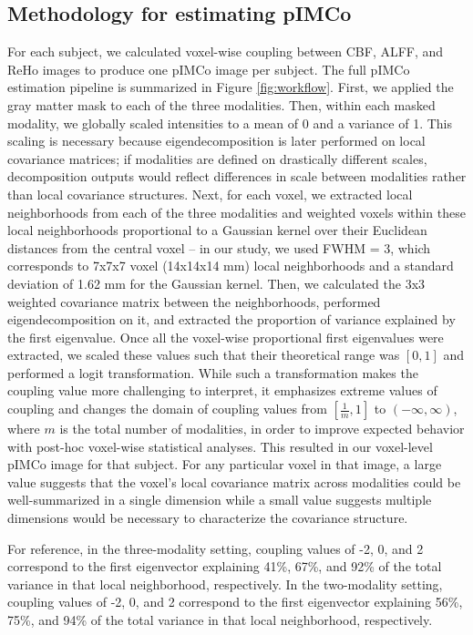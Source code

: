 \documentclass[
  12pt,
]{article}
\begin{document}
\hypertarget{methodology-for-estimating-pimco}{%
\subsection{Methodology for estimating pIMCo}\label{methodology-for-estimating-pimco}}

For each subject, we calculated voxel-wise coupling between CBF, ALFF, and ReHo images to produce one pIMCo image per subject. The full pIMCo estimation pipeline is summarized in Figure \ref{fig:workflow}. First, we applied the gray matter mask to each of the three modalities. Then, within each masked modality, we globally scaled intensities to a mean of 0 and a variance of 1. This scaling is necessary because eigendecomposition is later performed on local covariance matrices; if modalities are defined on drastically different scales, decomposition outputs would reflect differences in scale between modalities rather than local covariance structures. Next, for each voxel, we extracted local neighborhoods from each of the three modalities and weighted voxels within these local neighborhoods proportional to a Gaussian kernel over their Euclidean distances from the central voxel -- in our study, we used FWHM = 3, which corresponds to 7x7x7 voxel (14x14x14 mm) local neighborhoods and a standard deviation of 1.62 mm for the Gaussian kernel. Then, we calculated the 3x3 weighted covariance matrix between the neighborhoods, performed eigendecomposition on it, and extracted the proportion of variance explained by the first eigenvalue. Once all the voxel-wise proportional first eigenvalues were extracted, we scaled these values such that their theoretical range was \([0, 1]\) and performed a logit transformation. While such a transformation makes the coupling value more challenging to interpret, it emphasizes extreme values of coupling and changes the domain of coupling values from \([\frac{1}{m}, 1]\) to \((-\infty, \infty)\), where \(m\) is the total number of modalities, in order to improve expected behavior with post-hoc voxel-wise statistical analyses. This resulted in our voxel-level pIMCo image for that subject. For any particular voxel in that image, a large value suggests that the voxel's local covariance matrix across modalities could be well-summarized in a single dimension while a small value suggests multiple dimensions would be necessary to characterize the covariance structure.

For reference, in the three-modality setting, coupling values of -2, 0, and 2 correspond to the first eigenvector explaining 41\%, 67\%, and 92\% of the total variance in that local neighborhood, respectively. In the two-modality setting, coupling values of -2, 0, and 2 correspond to the first eigenvector explaining 56\%, 75\%, and 94\% of the total variance in that local neighborhood, respectively.
\end{document}
